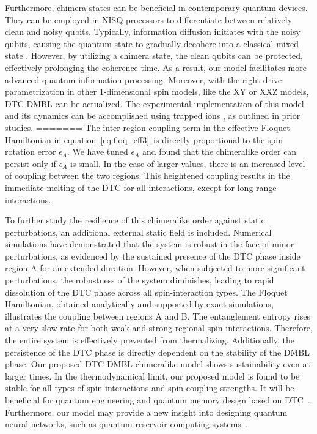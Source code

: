 \documentclass[12pt]{iopart}
\begin{document}
Furthermore, chimera states can be beneficial in contemporary quantum devices. They can be employed in NISQ processors to differentiate between relatively clean and noisy qubits. Typically, information diffusion initiates with the noisy qubits, causing the quantum state to gradually decohere into a classical mixed state \cite{Bharti2022}. However, by utilizing a chimera state, the clean qubits can be protected, effectively prolonging the coherence time. As a result, our model facilitates more advanced quantum information processing. Moreover, with the right drive parametrization in other 1-dimensional spin models, like the XY or XXZ models, DTC-DMBL can be actualized. The experimental implementation of this model and its dynamics can be accomplished using trapped ions \cite{sakurai_phys_nodate, Friedenauer2008}, as outlined in prior studies.
=======
The inter-region coupling term in the effective Floquet Hamiltonian in equation~\ref{eq:floq_eff3} is directly proportional to the spin rotation error $\epsilon_A$. We have tuned $\epsilon_A$ and found that the chimeralike order can persist only if $\epsilon_A$ is small. In the case of larger values, there is an increased level of coupling between the two regions. This heightened coupling results in the immediate melting of the DTC for all interactions, except for long-range interactions.
	
To further study the resilience of this chimeralike order against static perturbations, an additional external static field is included. Numerical simulations have demonstrated that the system is robust in the face of minor perturbations, as evidenced by the sustained presence of the DTC phase inside region A for an extended duration. However, when subjected to more significant perturbations, the robustness of the system diminishes, leading to rapid dissolution of the DTC phase across all spin-interaction types. The Floquet Hamiltonian, obtained analytically and supported by exact simulations, illustrates the coupling between regions A and B. The entanglement entropy rises at a very slow rate for both weak and strong regional spin interactions. Therefore, the entire system is effectively prevented from thermalizing. Additionally, the persistence of the DTC phase is directly dependent on the stability of the DMBL phase. Our proposed DTC-DMBL chimeralike model shows sustainability even at larger times. In the thermodynamical limit, our proposed model is found to be stable for all types of spin interactions and spin coupling strengths. It will be beneficial for quantum engineering and quantum memory design based on DTC~\cite{zhang_observation_2017}. Furthermore, our model may provide a new insight into designing quantum neural networks, such as quantum reservoir computing systems~\cite{Fujii_2017, Martinez_2021,Mujal_2021, Akitada2022}.
\end{document}
